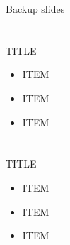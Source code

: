 \documentclass[14pt,dvipdfmx]{beamer}
\begin{document}
\appendix
\bgroup   
{}
\begin{frame}[plain]{}
\end{frame}
\egroup
\bgroup
{}
\begin{frame}[plain]{}
\centering
Backup slides
\end{frame}
\egroup

\section[]{}
\begin{frame}[containsverbatim,c]{%
TITLE}
\begin{center}
\footnotesize
{\setlength{\leftmargini}{12pt}
\setlength{\leftmarginii}{16pt}
\begin{itemize}
 \item
ITEM
 \item
ITEM
 \item
ITEM
\end{itemize}}
\end{center}
\end{frame}

\section[]{}
\begin{frame}[containsverbatim,c]{%
TITLE}
\begin{center}
\footnotesize
{\setlength{\leftmargini}{12pt}
\setlength{\leftmarginii}{16pt}
\begin{itemize}
 \item
ITEM
 \item
ITEM
 \item
ITEM
\end{itemize}}
\end{center}
\end{frame}

 
\end{document}
